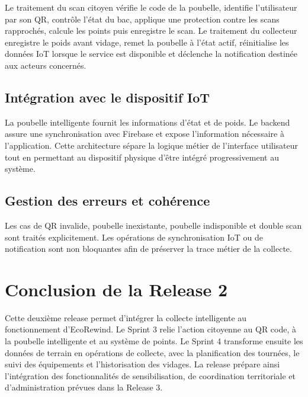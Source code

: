 Le traitement du scan citoyen vérifie le code de la poubelle, identifie l'utilisateur par son QR, contrôle l'état du bac, applique une protection contre les scans rapprochés, calcule les points puis enregistre le scan. Le traitement du collecteur enregistre le poids avant vidage, remet la poubelle à l'état actif, réinitialise les données IoT lorsque le service est disponible et déclenche la notification destinée aux acteurs concernés.

\subsection{Intégration avec le dispositif IoT}
La poubelle intelligente fournit les informations d'état et de poids. Le backend assure une synchronisation avec Firebase et expose l'information nécessaire à l'application. Cette architecture sépare la logique métier de l'interface utilisateur tout en permettant au dispositif physique d'être intégré progressivement au système.

\subsection{Gestion des erreurs et cohérence}
Les cas de QR invalide, poubelle inexistante, poubelle indisponible et double scan sont traités explicitement. Les opérations de synchronisation IoT ou de notification sont non bloquantes afin de préserver la trace métier de la collecte.

\section{Conclusion de la Release 2}
Cette deuxième release permet d'intégrer la collecte intelligente au fonctionnement d'EcoRewind. Le Sprint 3 relie l'action citoyenne au QR code, à la poubelle intelligente et au système de points. Le Sprint 4 transforme ensuite les données de terrain en opérations de collecte, avec la planification des tournées, le suivi des équipements et l'historisation des vidages. La release prépare ainsi l'intégration des fonctionnalités de sensibilisation, de coordination territoriale et d'administration prévues dans la Release 3.
